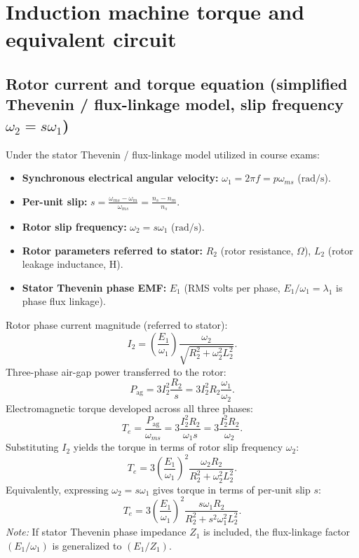 \section{Induction machine torque and equivalent circuit}

\subsection{Rotor current and torque equation (simplified Thevenin / flux-linkage model, slip frequency \texorpdfstring{$\omega_2 = s \omega_1$}{omega_2 = s omega_1})}
Under the stator Thevenin / flux-linkage model utilized in course exams:
\begin{itemize}
  \item \textbf{Synchronous electrical angular velocity:} \(\omega_1 = 2\pi f = p \omega_{ms}\) (\(\mathrm{rad/s}\)).
  \item \textbf{Per-unit slip:} \(s = \frac{\omega_{ms}-\omega_m}{\omega_{ms}} = \frac{n_s-n_m}{n_s}\).
  \item \textbf{Rotor slip frequency:} \(\omega_2 = s \omega_1\) (\(\mathrm{rad/s}\)).
  \item \textbf{Rotor parameters referred to stator:} \(R_2\) (rotor resistance, \(\Omega\)), \(L_2\) (rotor leakage inductance, \(\mathrm{H}\)).
  \item \textbf{Stator Thevenin phase EMF:} \(E_1\) (RMS volts per phase, \(E_1/\omega_1 = \lambda_1\) is phase flux linkage).
\end{itemize}

Rotor phase current magnitude (referred to stator):
\[
I_2 = \left(\frac{E_1}{\omega_1}\right)\frac{\omega_2}{\sqrt{R_2^2 + \omega_2^2 L_2^2}}.
\]
Three-phase air-gap power transferred to the rotor:
\[
P_{\mathrm{ag}} = 3 I_2^2 \frac{R_2}{s} = 3 I_2^2 R_2 \frac{\omega_1}{\omega_2}.
\]
Electromagnetic torque developed across all three phases:
\[
T_e = \frac{P_{\mathrm{ag}}}{\omega_{ms}} = 3\frac{I_2^2 R_2}{\omega_1 s} = 3\frac{I_2^2 R_2}{\omega_2}.
\]
Substituting \(I_2\) yields the torque in terms of rotor slip frequency \(\omega_2\):
\[
T_e = 3\left(\frac{E_1}{\omega_1}\right)^2\frac{\omega_2 R_2}{R_2^2 + \omega_2^2 L_2^2}.
\]
Equivalently, expressing \(\omega_2 = s \omega_1\) gives torque in terms of per-unit slip \(s\):
\[
T_e = 3\left(\frac{E_1}{\omega_1}\right)^2\frac{s \omega_1 R_2}{R_2^2 + s^2 \omega_1^2 L_2^2}.
\]
\emph{Note:} If stator Thevenin phase impedance \(Z_1\) is included, the flux-linkage factor \(\left(E_1/\omega_1\right)\) is generalized to \(\left(E_1/Z_1\right)\).

